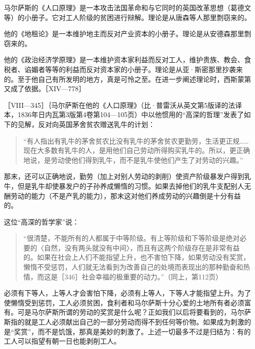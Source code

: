 
马尔萨斯的《人口原理》是一本攻击法国革命和与它同时的英国改革思想（葛德文等）的小册子。它对工人阶级的贫困进行辩解。理论是从唐森等人那里剽窃来的。

他的《地租论》是一本维护地主而反对产业资本的小册子。理论是从安德森那里剽窃来的。

他的《政治经济学原理》是一本维护资本家利益而反对工人，维护贵族、教会、食税者、谄媚者等等的利益而反对资本家的小册子。理论是从亚·斯密那里抄袭来的。至于他自己有所发明的地方，真是可怜之至。在进一步阐述理论时，西斯蒙第又成了依据。［XIV—778］


［VIII—345］｛马尔萨斯在他的《人口原理》（比·普雷沃从英文第5版译的法译本，1836年日内瓦第3版第4卷第104—105页）中以他惯用的“高深的哲理”发表了如下的见解，反对向英国茅舍贫农赠送乳牛的计划：

\begin{quote}{“有人指出有乳牛的茅舍贫农比没有乳牛的茅舍贫农更勤劳，生活更正规……现在大多数有乳牛的人，是用他们自己劳动所得购买乳牛的。所以，更正确地说，是劳动使他们得到乳牛，而不是乳牛使他们产生了对劳动的兴趣。”}\end{quote}

那末，还可以正确地说，勤劳（加上对别人劳动的剥削）使资产阶级暴发户得到乳牛，但是乳牛却使暴发户的子孙养成懒惰的习惯。如果去掉他们的乳牛支配别人无酬劳动的能力（不是产乳的能力），那末这对他们养成劳动的兴趣倒是十分有益的。

这位“高深的哲学家”说：

\begin{quote}{“很清楚，不能所有的人都属于中等阶级。有上等阶级和下等阶级是绝对必要的〈自然，没有两头就没有中间〉，而且有这两个阶级存在是非常有益的。如果在社会上人们不能指望上升，也不害怕下降，如果劳动没有奖赏，懒惰不受惩罚，人们就无法看到为改善自己的处境而表现出的那种勤奋和热情，而这是［346］社会幸福的极重要的动力。”（同上，第112页）}\end{quote}

必须有下等人，上等人才会害怕下降，必须有上等人，下等人才能指望上升。为了使懒惰受到惩罚，工人必须贫困，食利者和马尔萨斯十分心爱的土地所有者必须富有。可是马尔萨斯所谓的劳动的奖赏是什么呢？正如我们以后将要看到的，马尔萨斯指的就是工人必须献出自己的一部分劳动而得不到任何等价物。如果成为刺激的是“奖赏”，而不是饥饿，那真是美妙的刺激了。上述一切最多不过是归结为：有的工人可以指望有朝一日也能剥削工人。

